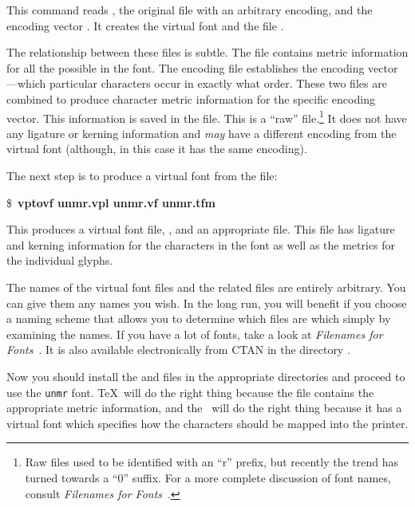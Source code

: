 This command reads , the original  file with
an arbitrary encoding, and the encoding vector .  It
creates the virtual font  and the  file
.

The relationship between these files is subtle.  The  file
contains metric information for all the possible  in the font.
The encoding file establishes the encoding vector---which particular
characters occur in exactly what order.  These two files are combined
to produce character metric information for the specific encoding
vector.  This information is saved in the  file.  This is a
``raw''  file.\footnote{Raw  files 
used to be identified
with an ``r'' prefix, but recently the trend has turned towards a ``0''
suffix.  For a more complete discussion of font names, consult
\textit{Filenames for Fonts}~\cite{tug:filenames-fonts}.}
It does not have any
ligature or kerning information and \emph{may} have a different
encoding from the virtual font (although, in this case it has 
the same encoding).

The next step is to produce a virtual font from the  
file:

\begin{ttindent}
\$\ {\bf vptovf unmr.vpl unmr.vf unmr.tfm}
\end{ttindent}

This produces a virtual font file, , and an appropriate
 file.  This  file has ligature and kerning
information for the characters in the font as well as the metrics for
the individual glyphs.

The names of the virtual font files and the related  files
are entirely arbitrary.  You can give them any names you wish.  In the
long run, you will benefit if you choose a naming scheme that allows
you to determine which files are which simply by examining the names.
If you have a lot of fonts, take a look at \emph{Filenames for
Fonts}~\cite{tug:filenames-fonts}.  It is also available electronically
from CTAN in the directory .

Now you should install the  and  files in the appropriate
directories and proceed to use the \texttt{unmr} font.  \TeX\ will
do the right thing because the  file contains the appropriate
metric information, and the \dvidriver\ will do the right thing because
it has a virtual font which specifies how the characters should be mapped
into the printer.  


